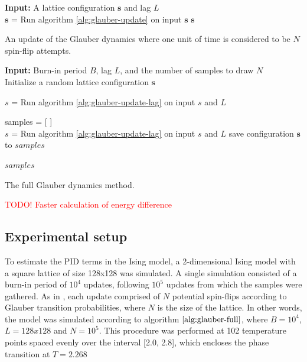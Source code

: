 \documentclass[12pt]{article}
\begin{document}
\begin{algorithm}
\textbf{Input:} A lattice configuration $\boldsymbol{s}$ and lag $L$ \\
 {
	$\boldsymbol{s}$ = Run algorithm \ref{alg:glauber-update} on input $\boldsymbol{s}$\;
}
\Return $\boldsymbol{s}$\;
\label{alg:glauber-update-lag}
\caption{An update of the Glauber dynamics where one unit of time is considered to be $N$ spin-flip attempts.}
\end{algorithm}

\begin{algorithm}
\textbf{Input:} Burn-in period $B$, lag $L$, and the number of samples to draw $N$ \\ 
Initialize a random lattice configuration $\boldsymbol{s}$\;

 {  
	$s$ = Run algorithm \ref{alg:glauber-update-lag} on input $s$ and $L$\;
}

samples = [ ]  \\
 {
	$s$ = Run algorithm \ref{alg:glauber-update-lag} on input $s$ and $L$\;
	save configuration $\boldsymbol{s}$ to $samples$\;
}

\Return $samples$
\label{alg:glauber-full}
\caption{The full Glauber dynamics method.}
\end{algorithm}

\textcolor{red}{TODO! Faster calculation of energy difference}

\subsection{Experimental setup}

To estimate the PID terms in the Ising model, a 2-dimensional Ising model with a square lattice of size 128x128 was simulated. A single simulation consisted of a burn-in period of $10^4$ updates, following $10^5$ updates from which the samples were gathered. As in \cite{barnett-ising}, each update comprised of $N$ potential spin-flips according to Glauber transition probabilities, where $N$ is the size of the lattice. In other words, the model was simulated according to algorithm $\ref{alg:glauber-full}$, where $B=10^4$, $L=128x128$ and $N=10^5$. This procedure was performed at 102 temperature points spaced evenly over the interval [2.0, 2.8], which encloses the phase transition at $T = 2.268$
\end{document}

